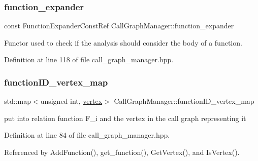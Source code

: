 \mbox{\label{classCallGraphManager_a5ce1c00a1075535b68287a08e3fd6b1b}} 
\subsubsection{\texorpdfstring{function\+\_\+expander}{function\_expander}}
{\footnotesize\ttfamily const Function\+Expander\+Const\+Ref Call\+Graph\+Manager\+::function\+\_\+expander}



Functor used to check if the analysis should consider the body of a function. 



Definition at line 118 of file call\+\_\+graph\+\_\+manager.\+hpp.

\mbox{\label{classCallGraphManager_ad632d9efbc89d01b3073d7a8236aec31}} 
\subsubsection{\texorpdfstring{function\+I\+D\+\_\+vertex\+\_\+map}{functionID\_vertex\_map}}
{\footnotesize\ttfamily std\+::map$<$unsigned int, \hyperlink{graph_8hpp_abefdcf0544e601805af44eca032cca14}{vertex}$>$ Call\+Graph\+Manager\+::function\+I\+D\+\_\+vertex\+\_\+map\hspace{0.3cm}{\ttfamily [private]}}



put into relation function F\+\_\+i and the vertex in the call graph representing it 



Definition at line 84 of file call\+\_\+graph\+\_\+manager.\+hpp.



Referenced by Add\+Function(), get\+\_\+function(), Get\+Vertex(), and Is\+Vertex().

\mbox{\label{classCallGraphManager_a56c89c8fc4a0a38536bcd58005a428cb}} 
